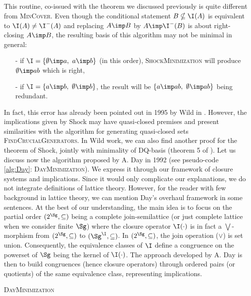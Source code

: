 This routine, co-issued with the theorem we discussed previously is 
quite different from \textsc{MinCover}. Even though the conditional statement 
$B \nsubseteq \I(A)$ is equivalent to $\I(A) \neq \I^{-}(A)$ and 
replacing $A \imp B$ by $A \imp \I^{-}(B)$ is about right-closing $A \imp B$, 
the resulting basis of this algorithm may not be minimal in
general:
\begin{itemize}
	\item[-] if $\I = \{ \emptyset \imp a, \ a \imp b \}$ (in this order), 
	\textsc{ShockMinimization} will produce $\emptyset \imp ab$ which is right,
	\item[-] if $\I = \{ a \imp b, \ \emptyset \imp b \}$, the result will
	be $\{ a \imp ab, \ \emptyset \imp ab \}$ being redundant.
\end{itemize} 
In fact, this error has already been pointed out in 1995 by Wild in 
\cite{wild_computations_1995}. However, the implications given by Shock may have quasi-closed premises and present similarities with the algorithm for generating quasi-closed sets \textsc{FindCrucialGenerators}. In Wild work, we can also find another proof for the theorem of Shock, jointly with minimality of DQ-basis (theorem 5 of \cite{wild_theory_1994, wild_computations_1995}). Let us discuss now the algorithm proposed by A. Day in 1992 (see pseudo-code \ref{alg:Day}: \textsc{DayMinimization}). We express it through our framework of closure systems and implications. Since it would only complicate our explanations, we do not integrate definitions of lattice theory. However, for the reader with few background in lattice theory, we can mention Day's overhaul framework in some sentences. At the best of our understanding, the main idea is to focus on the partial order $(2^{\Sg}, \subseteq)$ being a complete join-semilattice (or just complete lattice when we consider finite $\Sg$) where the closure operator $\I(\cdot)$ is in fact a $\bigvee$-morphism from $(2^{\Sg}, \subseteq)$ to $(\Sg^{\I}, \subseteq)$. In $(2^{\Sg}, \subseteq)$, the join operation ($\lor$) is set union. Consequently, the equivalence classes of $\I$ define a congruence on the powerset of $\Sg$ being the kernel of $\I(\cdot)$. The approach developed by A. Day is then to build congruences (hence closure operators) through ordered pairs (or quotients) of the same equivalence class, representing implications.

\begin{algorithm}
	
	\BlankLine
	\BlankLine
	
	
	\caption{\textsc{DayMinimization}}
	\label{alg:Day}
\end{algorithm}

